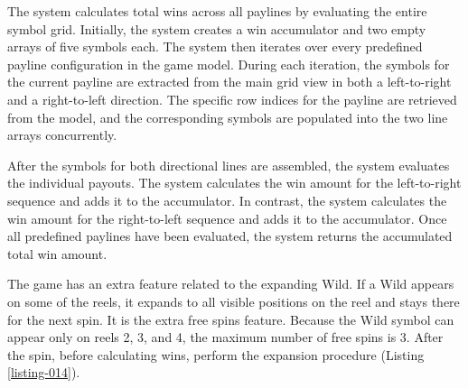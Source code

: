 \documentclass[12pt,twoside,openany]{book}
\begin{document}
The system calculates total wins across all paylines by evaluating the entire symbol grid. Initially, the system creates a win accumulator and two empty arrays of five symbols each. The system then iterates over every predefined payline configuration in the game model. During each iteration, the symbols for the current payline are extracted from the main grid view in both a left-to-right and a right-to-left direction. The specific row indices for the payline are retrieved from the model, and the corresponding symbols are populated into the two line arrays concurrently.

After the symbols for both directional lines are assembled, the system evaluates the individual payouts. The system calculates the win amount for the left-to-right sequence and adds it to the accumulator. In contrast, the system calculates the win amount for the right-to-left sequence and adds it to the accumulator. Once all predefined paylines have been evaluated, the system returns the accumulated total win amount.

The game has an extra feature related to the expanding Wild. If a Wild appears on some of the reels, it expands to all visible positions on the reel and stays there for the next spin. It is the extra free spins feature. Because the Wild symbol can appear only on reels 2, 3, and 4, the maximum number of free spins is 3. After the spin, before calculating wins, perform the expansion procedure (Listing \ref{listing-014}).
\end{document}
